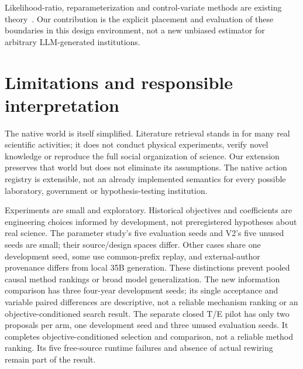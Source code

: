 Likelihood-ratio, reparameterization and control-variate methods are existing
theory~\citep{parmas2021unified,parmas2022proppo,parmas2023composite}.
Our contribution is the explicit placement and evaluation of these boundaries
in this design environment, not a new unbiased estimator for arbitrary
LLM-generated institutions.

\section{Limitations and responsible interpretation}
The native world is itself simplified. Literature retrieval stands in for
many real scientific activities; it does not conduct physical experiments,
verify novel knowledge or reproduce the full social organization of science.
Our extension preserves that world but does not eliminate its assumptions.
The native action registry is extensible, not an already implemented semantics
for every possible laboratory, government or hypothesis-testing institution.

Experiments are small and exploratory. Historical objectives and coefficients
are engineering choices informed by development, not preregistered hypotheses
about real science. The parameter study's five evaluation seeds and V2's five
unused seeds are small; their source/design spaces differ. Other cases share
one development seed, some use common-prefix replay, and external-author
provenance differs from local 35B generation. These distinctions prevent pooled
causal method rankings or broad model generalization.
The new information comparison has three four-year development seeds; its
single acceptance and variable paired differences are descriptive, not a
reliable mechanism ranking or an objective-conditioned search result.
The separate closed T/E pilot has only two proposals per arm, one development
seed and three unused evaluation seeds. It completes objective-conditioned
selection and comparison, not a reliable method ranking. Its five free-source
runtime failures and absence of actual rewiring remain part of the result.

